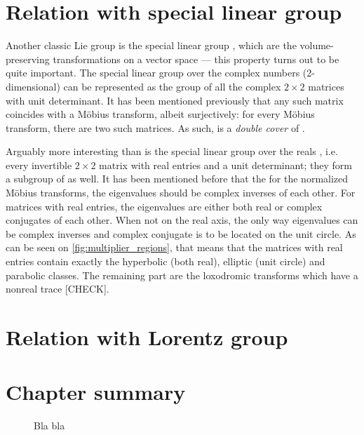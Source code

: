 \section{Relation with special linear group}
Another classic Lie group is the special linear group , which are the volume-preserving transformations on a vector space --- this property turns out to be quite important. The special linear group over the complex numbers (2-dimensional)  can be represented as the group of all the complex \(2\times2\) matrices with unit determinant. It has been mentioned previously that any such matrix coincides with a Möbius transform, albeit surjectively: for every Möbius transform, there are two such matrices. As such,  is a \emph{double cover} of \moebiusgroup.

Arguably more interesting than  is the special linear group over the reals , i.e. every invertible \(2 \times 2\) matrix with real entries and a unit determinant; they form a subgroup of  as well. It has been mentioned before that the for the normalized Möbius transforms, the eigenvalues should be complex inverses of each other. For matrices with real entries, the eigenvalues are either both real or complex conjugates of each other. When not on the real axis, the only way eigenvalues can be complex inverses and complex conjugate is to be located on the unit circle. As can be seen on \cref{fig:multiplier_regions}, that means that the matrices with real entries contain exactly the hyperbolic (both real), elliptic (unit circle) and parabolic classes. The remaining part are the loxodromic transforms which have a nonreal trace [CHECK].

\section{Relation with Lorentz group}

\section{Chapter summary}

\begin{figure}
    \centering
    
    \caption{Bla bla}
\end{figure}

